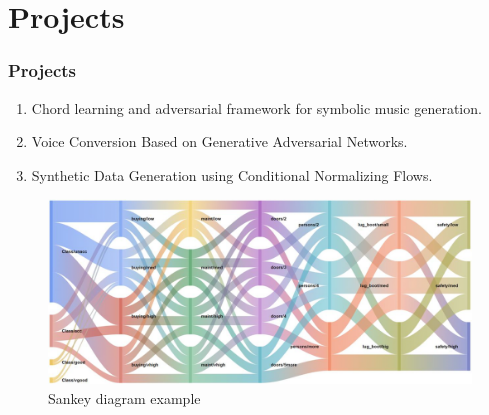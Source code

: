 \documentclass{beamer}
\begin{document}
\section{Projects}
\begin{frame}
    \frametitle{Projects}
    \begin{block}{}
        \begin{enumerate}
            \item Chord learning and adversarial framework for symbolic music generation.
            \item Voice Conversion Based on Generative Adversarial Networks.
            \item Synthetic Data Generation using Conditional Normalizing Flows.
        \end{enumerate}

        \begin{figure}[H]
            \centering
            \includegraphics[scale=0.19]{img/cnf.png}
            \caption{Sankey diagram example}
        \end{figure}
    \end{block}
\end{frame}
\end{document}
